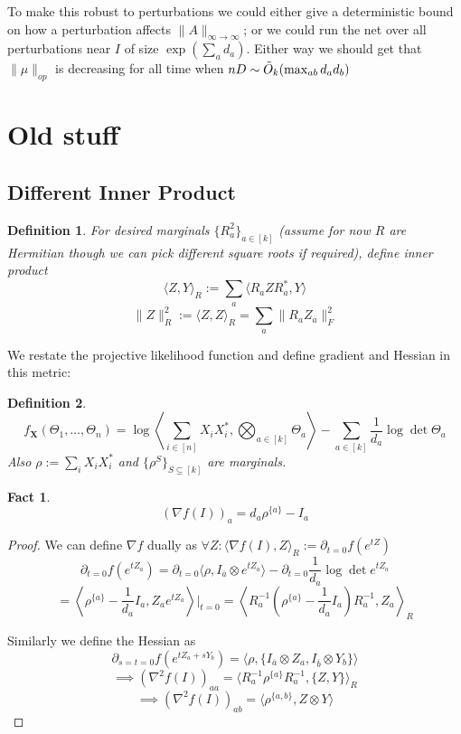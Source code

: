 \documentclass{article}
\newtheorem{fact}[theorem]{Fact}
\newtheorem{definition}{Definition}
\renewcommand{\vec}{\bm}
\begin{document}
To make this robust to perturbations we could either give a deterministic bound on how a perturbation affects $\|A\|_{\infty \to \infty}$; or we could run the net over all perturbations near $I$ of size $\exp( \sum_{a} d_{a} )$. Either way we should get that $\|\mu\|_{op}$ is decreasing for all time when $nD \sim \Tilde{O}_{k}(\max_{ab} d_{a} d_{b} )$



\section{Old stuff}

\subsection{Different Inner Product}

\begin{definition}
For desired marginals $\{R_{a}^{2}\}_{a \in [k]}$ (assume for now $R$ are Hermitian though we can pick different square roots if required), define inner product
\[ \langle Z, Y \rangle_{R} := \sum_{a} \langle R_{a} Z R_{a}^{*}, Y \rangle \]
\[ \|Z\|_{R}^{2} := \langle Z, Z \rangle_{R} = \sum_{a} \|R_{a} Z_{a}\|_{F}^{2}   \]
\end{definition}

We restate the projective likelihood function and define gradient and Hessian in this metric:

\begin{definition}
\[ f_{\vec X}(\Theta_1, \dots, \Theta_n) = \log \left\langle \sum_{i \in [n]} X_{i} X_{i}^{*},  \bigotimes_{a \in [k]} \Theta_a \right\rangle - \sum_{a \in [k]} \frac{1}{d_a} \log\det \Theta_a  \]
Also $\rho := \sum_{i} X_{i} X_{i}^{*}$ and $\{\rho^{S}\}_{S \subseteq [k]}$ are marginals.
\end{definition}

\begin{fact}
\[ (\nabla f(I))_{a} = d_{a} \rho^{\{a\}} - I_{a}  \]
\end{fact}
\begin{proof}
We can define $\nabla f$ dually as $\forall Z: \langle \nabla f(I), Z \rangle_{R} := \partial_{t=0} f(e^{tZ})$
\[ \partial_{t=0} f(e^{t Z_{a}}) = \partial_{t=0} \langle \rho, I_{\overline{a}} \otimes e^{tZ_{a}}  \rangle - \partial_{t=0} \frac{1}{d_{a}} \log\det e^{t Z_{a}}  \]
\[ = \left\langle \rho^{\{a\}} - \frac{1}{d_{a}} I_{a}, Z_{a} e^{t Z_{a}} \right\rangle|_{t=0} = \left\langle R_{a}^{-1} \left( \rho^{\{a\}} - \frac{1}{d_{a}} I_{a} \right) R_{a}^{-1}, Z_{a} \right\rangle_{R}   \]

Similarly we define the Hessian as
\[ \partial_{s=t=0} f(e^{tZ_{a} + sY_{b}}) = \langle \rho, \{ I_{\overline{a}} \otimes Z_{a}, I_{\overline{b}} \otimes Y_{b} \} \rangle   \]
\[ \implies (\nabla^{2} f(I))_{aa} = \langle R_{a}^{-1} \rho^{\{a\}} R_{a}^{-1}, \{Z, Y\} \rangle_{R}    \]
\[ \implies (\nabla^{2} f(I))_{ab} = \langle \rho^{\{a,b\}}, Z \otimes Y \rangle   \]
\end{proof}
\end{document}
